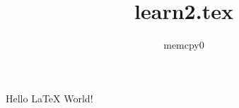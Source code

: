 \documentclass{article}
\author{memcpy0}
\title{learn2.tex}
\begin{document}
    \maketitle
    Hello LaTeX World!
\end{document}
